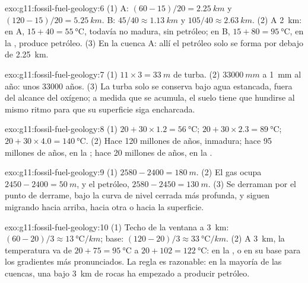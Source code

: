 \begin{solution}{exo:g11:fossil-fuel-geology:6}
(1) A: $(60 - 15)/20 = \qty{2.25}{km}$ y $(120 - 15)/20 = \qty{5.25}{km}$.
B: $45/40 \approx \qty{1.13}{km}$ y $105/40 \approx \qty{2.63}{km}$.
(2) A \qty{2}{km}: en A, $15 + 40 = \qty{55}{\degreeCelsius}$, todavía no
madura, sin petróleo; en B, $15 + 80 = \qty{95}{\degreeCelsius}$, en la
, produce petróleo. (3) En la cuenca A: allí el petróleo
solo se forma por debajo de \qty{2.25}{km}.
\end{solution}

\begin{solution}{exo:g11:fossil-fuel-geology:7}
(1) $11 \times 3 = \qty{33}{m}$ de turba. (2) $\qty{33000}{mm}$ a
\qty{1}{mm} al año: unos \num{33000} años. (3) La turba solo se conserva bajo
agua estancada, fuera del alcance del oxígeno; a medida que se acumula, el
suelo tiene que hundirse al mismo ritmo para que su superficie siga
encharcada.
\end{solution}

\begin{solution}{exo:g11:fossil-fuel-geology:8}
(1) $20 + 30 \times 1.2 = \qty{56}{\degreeCelsius}$;
$20 + 30 \times 2.3 = \qty{89}{\degreeCelsius}$;
$20 + 30 \times 4.0 = \qty{140}{\degreeCelsius}$.
(2) Hace 120 millones de años, inmadura; hace 95 millones de años, en la
; hace 20 millones de años, en la .
\end{solution}

\begin{solution}{exo:g11:fossil-fuel-geology:9}
(1) $2580 - 2400 = \qty{180}{m}$. (2) El gas ocupa
$2450 - 2400 = \qty{50}{m}$, y el petróleo, $2580 - 2450 = \qty{130}{m}$.
(3) Se derraman por el punto de derrame, bajo la curva de nivel cerrada más
profunda, y siguen migrando hacia arriba, hacia otra  o hacia la
superficie.
\end{solution}

\begin{solution}{exo:g11:fossil-fuel-geology:10}
(1) Techo de la ventana a \qty{3}{km}: $(60 - 20)/3 \approx
\qty{13}{\degreeCelsius/km}$; base: $(120 - 20)/3 \approx
\qty{33}{\degreeCelsius/km}$. (2) A \qty{3}{km}, la temperatura va de
$20 + 75 = \qty{95}{\degreeCelsius}$ a $20 + 102 = \qty{122}{\degreeCelsius}$:
en la , o en su base para los gradientes más
pronunciados. La regla es razonable: en la mayoría de las cuencas, una  bajo \qty{3}{km} de rocas ha empezado a producir petróleo.
\end{solution}

